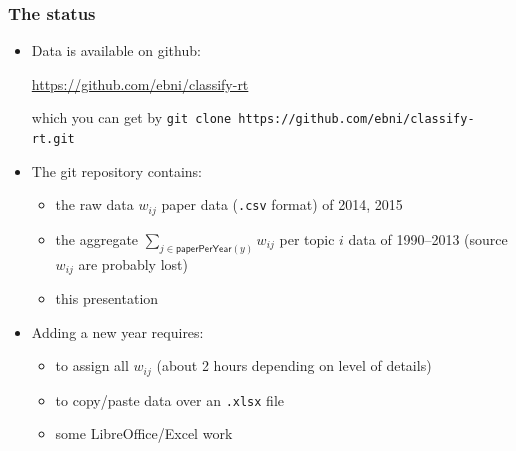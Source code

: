 \documentclass[ignorenonframetext,mathserif]{beamer} %
\begin{document}
  

\begin{frame}[fragile]
  \frametitle{The status}

  \begin{itemize}
  \item Data is available on github:
    \begin{center}
      \url{https://github.com/ebni/classify-rt}
    \end{center}
    which you can get by
    \verb|git clone https://github.com/ebni/classify-rt.git|
  \end{itemize}
  \begin{itemize}
  \item The git repository contains:
    \begin{itemize}
    \item the raw data $w_{ij}$ paper data (\texttt{.csv} format) of
      2014, 2015
    \item the aggregate $\sum_{j\in\mathsf{paperPerYear}(y)}w_{ij}$
      per topic $i$ data of 1990--2013 (source $w_{ij}$ are probably
      lost)
    \item this presentation
    \end{itemize}
  \item Adding a new year requires:
    \begin{itemize}
    \item to assign all $w_{ij}$ (about 2 hours depending on level of details)
    \item to copy/paste data over an \texttt{.xlsx} file 
    \item some LibreOffice/Excel work
    \end{itemize}
  \end{itemize}
\end{frame}
\end{document}
